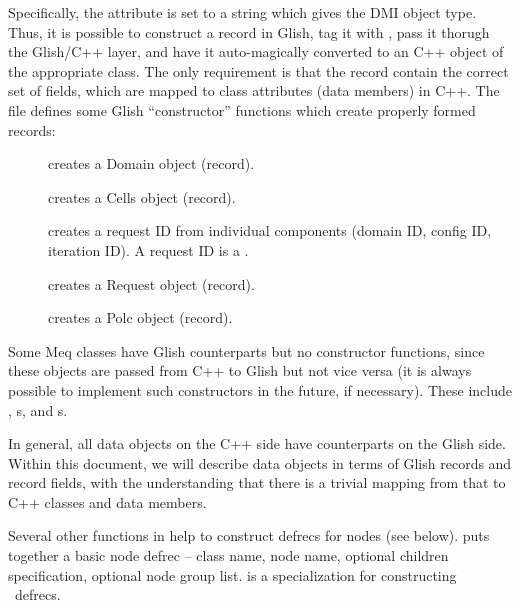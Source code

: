 \documentclass[10pt]{article}
\begin{document}
  Specifically, the  attribute is set to a string which
  gives the DMI object type. Thus, it is possible to construct a record in
  Glish, tag it with , pass it thorugh the Glish/C++
  layer, and have it auto-magically converted to an C++ object of the
  appropriate class. The only requirement is that the record contain the
  correct set of fields, which are mapped to class attributes (data members) in
  C++. The file  defines  some Glish ``constructor''
  functions which create properly formed records:

  \begin{description}
  
   \item[] creates a Domain object (record).

  \item[] creates a Cells object (record).

  \item[] creates a request ID from individual components
  (domain ID, config ID, iteration ID). A request ID is a .
  
  \item[] creates a Request object (record).
  
  \item[] creates a Polc object (record).
  
  \end{description}
  
  Some Meq classes have Glish counterparts but no constructor functions, since
  these objects are passed from C++ to Glish but not vice versa (it is always
  possible to implement such constructors in the future, if necessary). These
  include \Vells, \VellSet{}s, and \Result{}s.

  In general, all data objects on the C++ side have counterparts on the Glish
  side. Within this document, we will describe data objects in terms of Glish
  records and record fields, with the understanding that there is a trivial
  mapping from that to C++ classes and data members.

  Several other functions in  help to construct defrecs for
  nodes (see below).  puts together a basic node defrec -- class
  name, node name, optional children specification, optional node group
  list.  is a specialization for constructing \Parm\ defrecs.
    
\end{document}

